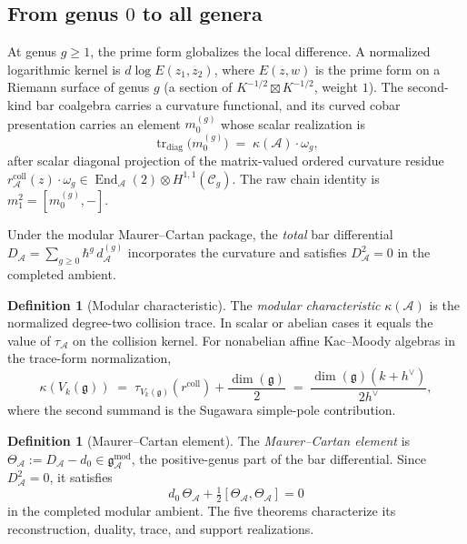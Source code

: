 \documentclass[11pt]{article}
\theoremstyle{plain}
\theoremstyle{definition}
\newtheorem{definition}[theorem]{Definition}
\theoremstyle{remark}
\newcommand{\fg}{\mathfrak{g}}
\newcommand{\cA}{\mathcal{A}}
\newcommand{\cC}{\mathcal{C}}
\newcommand{\gAmod}{\mathfrak{g}_{\cA}^{\mathrm{mod}}}
\begin{document}
\subsection{From genus $0$ to all genera}

At genus $g \geq 1$, the prime form globalizes the local difference.
A normalized logarithmic kernel is
$d\log E(z_1, z_2)$, where $E(z,w)$ is the prime form on a
Riemann surface of genus $g$ (a section of
$K^{-1/2} \boxtimes K^{-1/2}$, weight $1$).  The second-kind bar
coalgebra carries a curvature functional, and its curved cobar
presentation carries an element $m_0^{(g)}$ whose scalar realization
is
\begin{equation}\label{eq:curvature}
\operatorname{tr}_{\mathrm{diag}}\!\bigl(m_0^{(g)}\bigr)
\;=\; \kappa(\cA) \cdot \omega_g,
\end{equation}
after scalar diagonal projection of the matrix-valued ordered
curvature residue
$r^{\mathrm{coll}}_\cA(z)\cdot\omega_g\in
\operatorname{End}_\cA(2)\otimes H^{1,1}(\cC_g)$. The raw chain
identity is $m_1^2=[m_0^{(g)},-]$.

Under the modular Maurer--Cartan package, the \emph{total} bar
differential
$D_\cA = \sum_{g \geq 0} \hbar^g\, d_\cA^{(g)}$ incorporates the
curvature and satisfies $D_\cA^2 = 0$ in the completed ambient.

\begin{definition}[Modular characteristic]\label{def:kappa}
The \emph{modular characteristic} \(\kappa(\cA)\) is the normalized
degree-two collision trace. In scalar or abelian cases it equals the
value of \(\tau_\cA\) on the collision kernel. For nonabelian affine
Kac--Moody algebras in the
trace-form normalization,
\[
\kappa(V_k(\fg))
\;=\;
\tau_{V_k(\fg)}(r^{\mathrm{coll}})+\frac{\dim(\fg)}{2}
\;=\;
\frac{\dim(\fg)(k+h^\vee)}{2h^\vee},
\]
where the second summand is the Sugawara simple-pole contribution.
\end{definition}

\begin{definition}[Maurer--Cartan element]\label{def:mc}
The \emph{Maurer--Cartan element} is
$\Theta_\cA := D_\cA - d_0 \in \gAmod$, the positive-genus
part of the bar differential. Since $D_\cA^2 = 0$, it satisfies
\begin{equation}\label{eq:mc}
d_0\, \Theta_\cA + \tfrac{1}{2}[\Theta_\cA, \Theta_\cA] = 0
\end{equation}
in the completed modular ambient.  The five theorems characterize
its reconstruction, duality, trace, and support realizations.
\end{definition}
\end{document}
